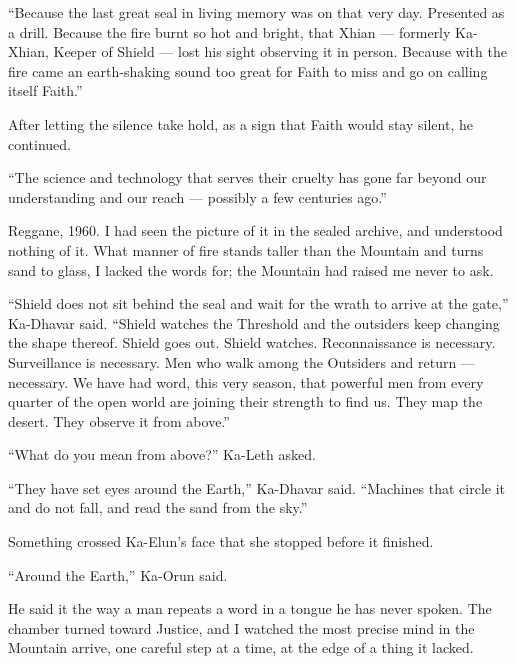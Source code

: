 ``Because the last great seal in living memory was on that very day. 
Presented as a drill. 
Because the fire burnt so hot and bright, that Xhian --- formerly Ka-Xhian, Keeper of Shield --- lost his sight observing it in person.
Because with the fire came an earth-shaking sound too great for Faith to miss and go on calling itself Faith.''

After letting the silence take hold, as a sign that Faith would stay silent, he continued.

``The science and technology that serves their cruelty has gone far beyond our understanding and our reach --- possibly a few centuries ago.''\par

Reggane, 1960. I had seen the picture of it in the sealed archive, and understood nothing of it. What manner of fire stands taller than the Mountain and turns sand to glass, I lacked the words for; the Mountain had raised me never to ask.\par
 
``Shield does not sit behind the seal and wait for the wrath to arrive at the gate,'' Ka-Dhavar said. 
``Shield watches the Threshold and the outsiders keep changing the shape thereof.
Shield goes out. Shield watches. Reconnaissance is necessary. Surveillance is necessary. 
Men who walk among the Outsiders and return --- necessary. We have had word, this very season, 
that powerful men from every quarter of the open world are joining their strength to find us. 
They map the desert. They observe it from above.''\par
 
``What do you mean from above?'' Ka-Leth asked. \par
 
``They have set eyes around the Earth,'' Ka-Dhavar said. ``Machines that circle it and do not fall, and read the sand from the sky.'' 
 
Something crossed Ka-Elun's face that she stopped before it finished.\par
 

\ornament
 
``Around the Earth,'' Ka-Orun said.\par
 
He said it the way a man repeats a word in a tongue he has never spoken. The chamber turned toward Justice, and I watched the most precise mind in the Mountain arrive, one careful step at a time, at the edge of a thing it lacked.\par
 
